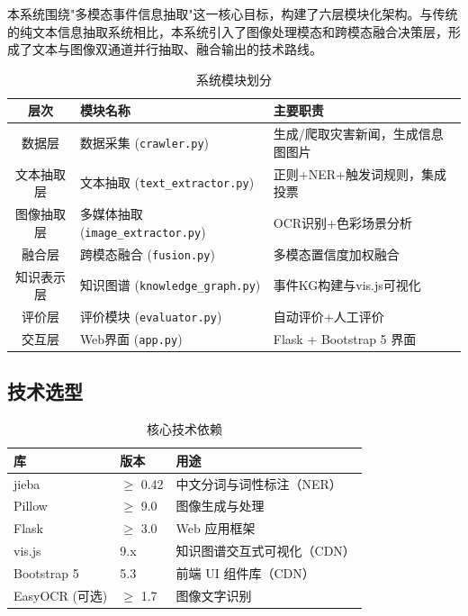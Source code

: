 \documentclass[12pt, a4paper]{ctexart}
\begin{document}
本系统围绕"多模态事件信息抽取"这一核心目标，构建了六层模块化架构。与传统的纯文本信息抽取系统相比，本系统引入了图像处理模态和跨模态融合决策层，形成了文本与图像双通道并行抽取、融合输出的技术路线。

\begin{table}[H]
\centering
\caption{系统模块划分}
\label{tab:modules}
\begin{tabular}{cll}
\toprule
\textbf{层次} & \textbf{模块名称} & \textbf{主要职责} \\
\midrule
数据层 & 数据采集 (\texttt{crawler.py}) & 生成/爬取灾害新闻，生成信息图图片 \\
文本抽取层 & 文本抽取 (\texttt{text\_extractor.py}) & 正则+NER+触发词规则，集成投票 \\
图像抽取层 & 多媒体抽取 (\texttt{image\_extractor.py}) & OCR识别+色彩场景分析 \\
融合层 & 跨模态融合 (\texttt{fusion.py}) & 多模态置信度加权融合 \\
知识表示层 & 知识图谱 (\texttt{knowledge\_graph.py}) & 事件KG构建与vis.js可视化 \\
评价层 & 评价模块 (\texttt{evaluator.py}) & 自动评价+人工评价 \\
交互层 & Web界面 (\texttt{app.py}) & Flask + Bootstrap 5 界面 \\
\bottomrule
\end{tabular}
\end{table}

\subsection{技术选型}

\begin{table}[H]
\centering
\caption{核心技术依赖}
\label{tab:tech}
\begin{tabular}{lll}
\toprule
\textbf{库} & \textbf{版本} & \textbf{用途} \\
\midrule
jieba & $\geq$ 0.42 & 中文分词与词性标注（NER） \\
Pillow & $\geq$ 9.0 & 图像生成与处理 \\
Flask & $\geq$ 3.0 & Web 应用框架 \\
vis.js & 9.x & 知识图谱交互式可视化（CDN） \\
Bootstrap 5 & 5.3 & 前端 UI 组件库（CDN） \\
EasyOCR (可选) & $\geq$ 1.7 & 图像文字识别 \\
\bottomrule
\end{tabular}
\end{table}
\end{document}
